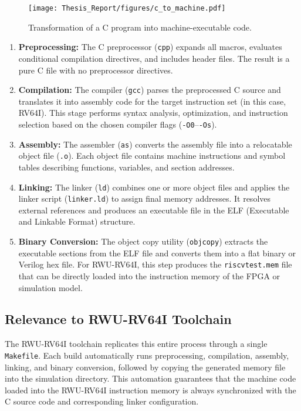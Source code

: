 \begin{figure}[H]
  \centering
  \texttt{[image: Thesis\_Report/figures/c\_to\_machine.pdf]}
  \caption{Transformation of a C program into machine-executable code.}
  \label{fig:rwu_c_to_machine}
\end{figure}

\begin{enumerate}
  \item \textbf{Preprocessing:}  
  The C preprocessor (\texttt{cpp}) expands all macros, evaluates conditional compilation directives, and includes header files.  
  The result is a pure C file with no preprocessor directives.

  \item \textbf{Compilation:}  
  The compiler (\texttt{gcc}) parses the preprocessed C source and translates it into assembly code for the target instruction set (in this case, RV64I).  
  This stage performs syntax analysis, optimization, and instruction selection based on the chosen compiler flags (\texttt{-O0}–\texttt{-Os}).

  \item \textbf{Assembly:}  
  The assembler (\texttt{as}) converts the assembly file into a relocatable object file (\texttt{.o}).  
  Each object file contains machine instructions and symbol tables describing functions, variables, and section addresses.

  \item \textbf{Linking:}  
  The linker (\texttt{ld}) combines one or more object files and applies the linker script (\texttt{linker.ld}) to assign final memory addresses.  
  It resolves external references and produces an executable file in the ELF (Executable and Linkable Format) structure.

  \item \textbf{Binary Conversion:}  
  The object copy utility (\texttt{objcopy}) extracts the executable sections from the ELF file and converts them into a flat binary or Verilog hex file.  
  For RWU-RV64I, this step produces the \texttt{riscvtest.mem} file that can be directly loaded into the instruction memory of the FPGA or simulation model.
\end{enumerate}



\subsection{Relevance to RWU-RV64I Toolchain}
The RWU-RV64I toolchain replicates this entire process through a single \texttt{Makefile}.  
Each build automatically runs preprocessing, compilation, assembly, linking, and binary conversion, followed by copying the generated memory file into the simulation directory.  
This automation guarantees that the machine code loaded into the RWU-RV64I instruction memory is always synchronized with the C source code and corresponding linker configuration.

